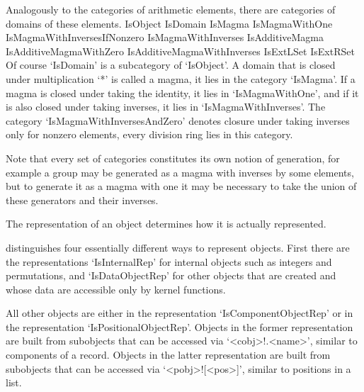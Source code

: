 Analogously to the categories of arithmetic elements,
there are categories of domains of these elements.
\beginexample
    IsObject
        IsDomain
            IsMagma
                IsMagmaWithOne
                    IsMagmaWithInversesIfNonzero
                        IsMagmaWithInverses
            IsAdditiveMagma
                IsAdditiveMagmaWithZero
                    IsAdditiveMagmaWithInverses
            IsExtLSet
            IsExtRSet
\endexample
Of course `IsDomain' is a subcategory of `IsObject'.
A domain that is closed under multiplication `*' is called a magma,
it lies in the category `IsMagma'.
If a magma is closed under taking the identity,
it lies in `IsMagmaWithOne',
and if it is also closed under taking inverses,
it lies in `IsMagmaWithInverses'.
The category `IsMagmaWithInversesAndZero' denotes closure under
taking inverses only for nonzero elements,
every division ring lies in this category.


Note that every set of categories constitutes its own notion of
generation, for example a group may be generated as a magma with inverses
by some elements,
but to generate it as a magma with one it may be necessary to take the
union of these generators and their inverses.


The representation of an object determines how it is actually
represented.

{\GAP} distinguishes four essentially different ways to represent
objects.
First there are the representations `IsInternalRep' for internal objects
such as integers and permutations,
and `IsDataObjectRep' for other objects that are created and whose data
are accessible only by kernel functions.


All other objects are either in the representation `IsComponentObjectRep'
or in the representation `IsPositionalObjectRep'.
Objects in the former representation are built from subobjects that can
be accessed via `<cobj>!.<name>', similar to components of a record.
Objects in the latter representation are built from subobjects that can
be accessed via `<pobj>![<pos>]', similar to positions in a list.

